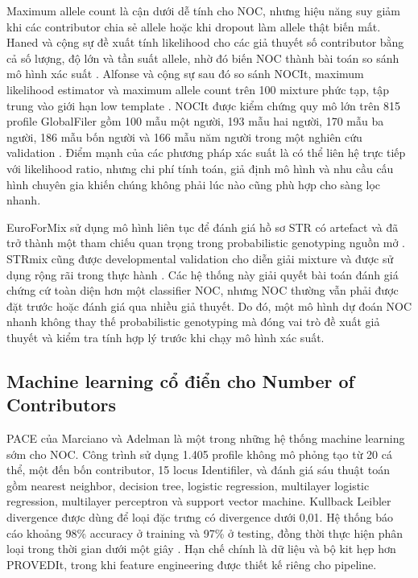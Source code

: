\documentclass[12pt,a4paper]{article}
\begin{document}
Maximum allele count là cận dưới dễ tính cho NOC, nhưng hiệu năng suy giảm khi các contributor chia sẻ allele hoặc khi dropout làm allele thật biến mất. Haned và cộng sự đề xuất tính likelihood cho các giả thuyết số contributor bằng cả số lượng, độ lớn và tần suất allele, nhờ đó biến NOC thành bài toán so sánh mô hình xác suất \cite{haned2011}. Alfonse và cộng sự sau đó so sánh NOCIt, maximum likelihood estimator và maximum allele count trên 100 mixture phức tạp, tập trung vào giới hạn low template \cite{alfonse2017}. NOCIt được kiểm chứng quy mô lớn trên 815 profile GlobalFiler gồm 100 mẫu một người, 193 mẫu hai người, 170 mẫu ba người, 186 mẫu bốn người và 166 mẫu năm người trong một nghiên cứu validation \cite{grgicak2020}. Điểm mạnh của các phương pháp xác suất là có thể liên hệ trực tiếp với likelihood ratio, nhưng chi phí tính toán, giả định mô hình và nhu cầu cấu hình chuyên gia khiến chúng không phải lúc nào cũng phù hợp cho sàng lọc nhanh.

EuroForMix sử dụng mô hình liên tục để đánh giá hồ sơ STR có artefact và đã trở thành một tham chiếu quan trọng trong probabilistic genotyping nguồn mở \cite{bleka2016}. STRmix cũng được developmental validation cho diễn giải mixture và được sử dụng rộng rãi trong thực hành \cite{bright2016}. Các hệ thống này giải quyết bài toán đánh giá chứng cứ toàn diện hơn một classifier NOC, nhưng NOC thường vẫn phải được đặt trước hoặc đánh giá qua nhiều giả thuyết. Do đó, một mô hình dự đoán NOC nhanh không thay thế probabilistic genotyping mà đóng vai trò đề xuất giả thuyết và kiểm tra tính hợp lý trước khi chạy mô hình xác suất.

\subsection{Machine learning cổ điển cho Number of Contributors}

PACE của Marciano và Adelman là một trong những hệ thống machine learning sớm cho NOC. Công trình sử dụng 1.405 profile không mô phỏng tạo từ 20 cá thể, một đến bốn contributor, 15 locus Identifiler, và đánh giá sáu thuật toán gồm nearest neighbor, decision tree, logistic regression, multilayer logistic regression, multilayer perceptron và support vector machine. Kullback Leibler divergence được dùng để loại đặc trưng có divergence dưới 0,01. Hệ thống báo cáo khoảng 98\% accuracy ở training và 97\% ở testing, đồng thời thực hiện phân loại trong thời gian dưới một giây \cite{marciano2017,alamoudi2022}. Hạn chế chính là dữ liệu và bộ kit hẹp hơn PROVEDIt, trong khi feature engineering được thiết kế riêng cho pipeline.
\end{document}
